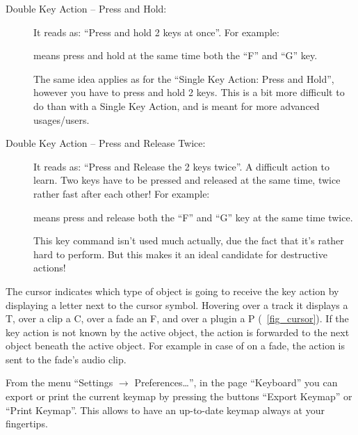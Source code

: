 \begin{description}
\item[Double Key Action  -- Press and Hold:]
It reads as: ``Press and hold 2 keys at once''. For example:
\begin{quotation}
\end{quotation}
means press and hold at the same time both the ``F'' and ``G'' key.

The same idea applies as for the ``Single Key Action: Press and Hold'', however you have to press and hold 2 keys. This is a bit more difficult to do than with a Single Key Action, and is meant for more advanced usages/users.

\item[Double Key Action  -- Press and Release Twice:]
It reads as: ``Press and Release the 2 keys twice''. A difficult action to learn. Two keys have to be pressed and released at the same time, twice rather fast after each other! For example:
\begin{quotation}
\end{quotation}
means press and release both the ``F'' and ``G'' key at the same time twice.

This key command isn't used much actually, due the fact that it's rather hard to perform. But this makes it an ideal candidate for destructive actions!
\end{description}

The cursor indicates which type of object is going to receive the key action by displaying a letter next to the cursor symbol. Hovering over a track it displays a T, over a clip a C, over a fade an F, and over a plugin a P (\FigB~\ref{fig_cursor}). If the key action is not known by the active object, the action is forwarded to the next object beneath the active object. For example in case of  on a fade, the action is sent to the fade's audio clip.

From the menu ``Settings $\rightarrow$ Preferences\dots'', in the page ``Keyboard'' you can export or print the current keymap by pressing the buttons ``Export Keymap'' or ``Print Keymap''. This allows to have an up-to-date keymap always at your fingertips.

